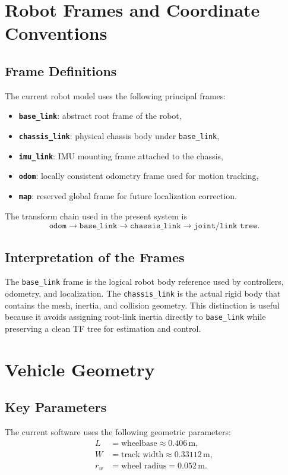 \documentclass[12pt,a4paper]{report}
\begin{document}
\chapter{Robot Frames and Coordinate Conventions}

\section{Frame Definitions}
The current robot model uses the following principal frames:
\begin{itemize}[leftmargin=*]
  \item \textbf{\texttt{base\_link}}: abstract root frame of the robot,
  \item \textbf{\texttt{chassis\_link}}: physical chassis body under \texttt{base\_link},
  \item \textbf{\texttt{imu\_link}}: IMU mounting frame attached to the chassis,
  \item \textbf{\texttt{odom}}: locally consistent odometry frame used for motion tracking,
  \item \textbf{\texttt{map}}: reserved global frame for future localization correction.
\end{itemize}

The transform chain used in the present system is
\begin{equation}
\texttt{odom} \rightarrow \texttt{base\_link} \rightarrow \texttt{chassis\_link} \rightarrow \texttt{joint/link tree}.
\end{equation}

\section{Interpretation of the Frames}
The \texttt{base\_link} frame is the logical robot body reference used by controllers, odometry, and localization. The \texttt{chassis\_link} is the actual rigid body that contains the mesh, inertia, and collision geometry. This distinction is useful because it avoids assigning root-link inertia directly to \texttt{base\_link} while preserving a clean TF tree for estimation and control.

\chapter{Vehicle Geometry}

\section{Key Parameters}
The current software uses the following geometric parameters:
\begin{align}
 L &= \text{wheelbase} \approx 0.406 \, \text{m}, \\
 W &= \text{track width} \approx 0.33112 \, \text{m}, \\
 r_w &= \text{wheel radius} = 0.052 \, \text{m}.
\end{align}
\end{document}
